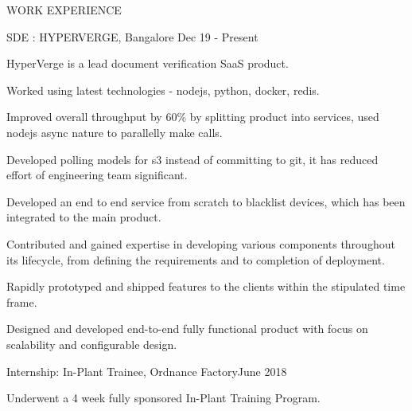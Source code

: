 \documentclass{resume} %
\begin{document}
\begin{rSection}{ WORK EXPERIENCE }

\begin{rSubsection}{ SDE : HYPERVERGE, Bangalore} {Dec 19 - Present}{}

\item  HyperVerge is a lead document verification SaaS product.
\item Worked using latest technologies - nodejs, python, docker, redis.
\item Improved overall throughput by 60\% by splitting product into services, used nodejs async nature to parallelly make calls.
\item Developed polling models for s3 instead of committing to git, it has reduced effort of engineering team significant.
\item Developed an end to end service from scratch to blacklist devices, which has been integrated to the main product.
\item Contributed and gained expertise in developing various components throughout its lifecycle, from defining the requirements and to completion of deployment.
\item Rapidly prototyped and shipped features to the clients within the stipulated time frame.
\item Designed and developed end-to-end fully functional product with focus on scalability and configurable design.

\end{rSubsection}


\begin{rSubsection}{ Internship: In-Plant Trainee, Ordnance Factory}{June 2018}{}

\item Underwent a 4 week fully sponsored In-Plant Training Program.

\end{rSubsection}

\end{rSection}
\end{document}
